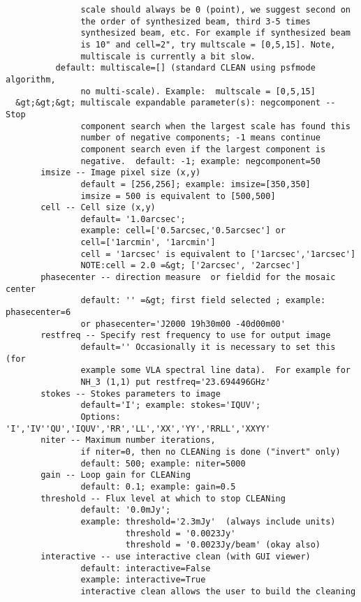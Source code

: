 \begin{verbatim}
               scale should always be 0 (point), we suggest second on
               the order of synthesized beam, third 3-5 times
               synthesized beam, etc. For example if synthesized beam
               is 10" and cell=2", try multscale = [0,5,15]. Note,
               multiscale is currently a bit slow.
 	      default: multiscale=[] (standard CLEAN using psfmode algorithm,
               no multi-scale). Example:  multscale = [0,5,15] 
  &gt;&gt;&gt; multiscale expandable parameter(s): negcomponent -- Stop
               component search when the largest scale has found this
               number of negative components; -1 means continue
               component search even if the largest component is
               negative.  default: -1; example: negcomponent=50
       imsize -- Image pixel size (x,y)
               default = [256,256]; example: imsize=[350,350]
               imsize = 500 is equivalent to [500,500]
       cell -- Cell size (x,y)
               default= '1.0arcsec';
               example: cell=['0.5arcsec,'0.5arcsec'] or
               cell=['1arcmin', '1arcmin']
               cell = '1arcsec' is equivalent to ['1arcsec','1arcsec']
               NOTE:cell = 2.0 =&gt; ['2arcsec', '2arcsec']
       phasecenter -- direction measure  or fieldid for the mosaic center
               default: '' =&gt; first field selected ; example: phasecenter=6
               or phasecenter='J2000 19h30m00 -40d00m00'
       restfreq -- Specify rest frequency to use for output image
               default='' Occasionally it is necessary to set this (for
               example some VLA spectral line data).  For example for
               NH_3 (1,1) put restfreq='23.694496GHz'
       stokes -- Stokes parameters to image
               default='I'; example: stokes='IQUV';
               Options: 'I','IV''QU','IQUV','RR','LL','XX','YY','RRLL','XXYY'
       niter -- Maximum number iterations,
               if niter=0, then no CLEANing is done ("invert" only)
               default: 500; example: niter=5000
       gain -- Loop gain for CLEANing
               default: 0.1; example: gain=0.5
       threshold -- Flux level at which to stop CLEANing
               default: '0.0mJy'; 
               example: threshold='2.3mJy'  (always include units)
                        threshold = '0.0023Jy'
                        threshold = '0.0023Jy/beam' (okay also)
       interactive -- use interactive clean (with GUI viewer)
               default: interactive=False
               example: interactive=True
               interactive clean allows the user to build the cleaning

\end{verbatim}
